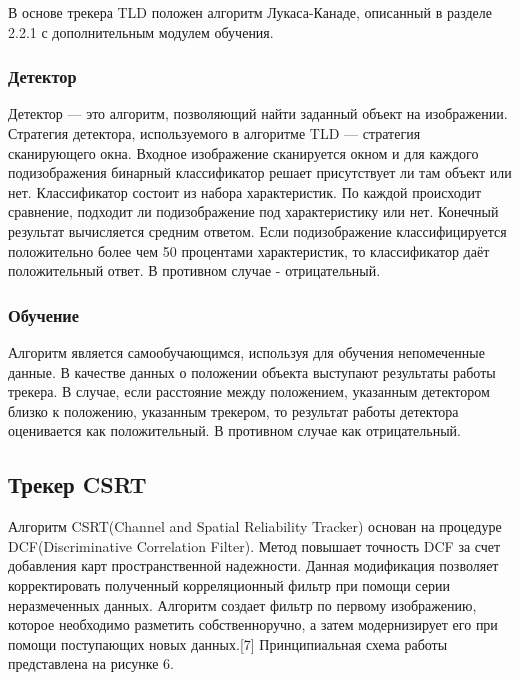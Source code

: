 \documentclass[a4paper,14pt]{extarticle}
\begin{document}
В основе трекера TLD положен алгоритм Лукаса-Канаде, описанный в разделе 2.2.1 с дополнительным модулем обучения.
\subsubsection{Детектор}
Детектор — это алгоритм, позволяющий найти заданный объект на изображении. Стратегия детектора, используемого в алгоритме TLD — стратегия сканирующего окна. Входное изображение сканируется окном и для каждого подизображения бинарный классификатор решает присутствует ли там объект или нет. Классификатор состоит из набора характеристик. По каждой происходит сравнение, подходит ли подизображение под характеристику или нет. Конечный результат вычисляется средним ответом. Если подизображение классифицируется положительно более чем 50 процентами характеристик, то классификатор даёт положительный ответ. В противном случае - отрицательный.

\subsubsection{Обучение}
Алгоритм является самообучающимся, используя для обучения
непомеченные данные. В качестве данных о положении объекта выступают результаты работы трекера. В случае, если расстояние между положением, указанным детектором близко к положению, указанным трекером, то результат работы детектора оценивается как положительный. В противном случае как отрицательный. 

\subsection{Трекер CSRT}
Алгоритм CSRT(Channel and Spatial Reliability Tracker) основан на процедуре DCF(Discriminative Correlation Filter). Метод повышает точность DCF за счет добавления карт пространственной надежности. Данная модификация позволяет корректировать полученный корреляционный фильтр при помощи серии неразмеченных данных. Алгоритм создает фильтр по первому изображению, которое необходимо разметить собственноручно, а затем модернизирует его при помощи поступающих новых данных.[7] Принципиальная схема работы представлена на рисунке 6.
\end{document}
